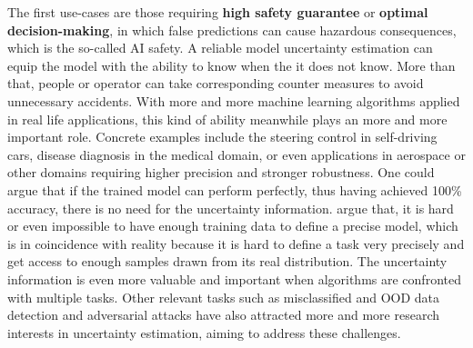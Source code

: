 The first use-cases are those requiring \textbf{high safety guarantee} or \textbf{optimal decision-making}, in which false predictions can cause hazardous consequences, which is the so-called AI safety\cite{amodei2016concrete}. A reliable model uncertainty estimation can equip the model with the ability to know when the it does not know. More than that, people or operator can take corresponding counter measures to avoid unnecessary accidents. With more and more machine learning algorithms applied in real life applications, this kind of ability meanwhile plays an more and more important role. Concrete examples include the steering control in self-driving cars\cite{mcallister2017concrete}, disease diagnosis in the medical domain\cite{leibig2017leveraging}, or even applications in aerospace or other domains requiring higher precision and stronger robustness. One could argue that if the trained model can perform perfectly, thus having achieved 100\% accuracy, there is no need for the uncertainty information. 
\cite{denker1991transforming} argue that, it is hard or even impossible to have enough training data to define a precise model, which is in coincidence with reality because it is hard to define a task very precisely and get access to enough samples drawn from its real distribution. The uncertainty information is even more valuable and important when algorithms are confronted with multiple tasks\cite{kendall2017multi}. Other relevant tasks such as misclassified 
and \gls{OOD} data detection\cite{hendrycks2016baseline} and adversarial attacks \cite{kurakin2016adversarial, feinman2017detecting} 
have also attracted more and more research interests in uncertainty estimation, aiming to address these challenges.

